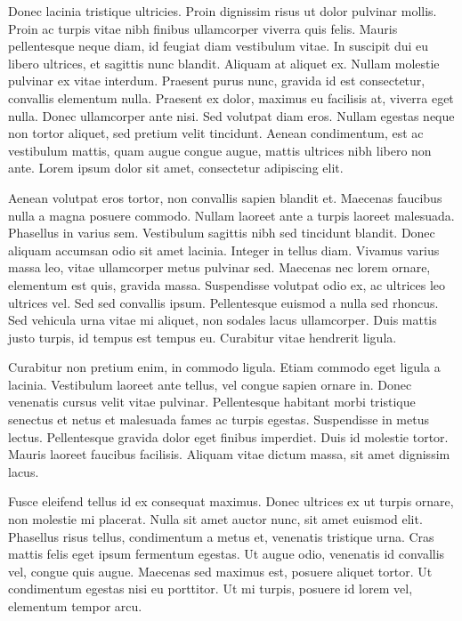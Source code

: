 Donec lacinia tristique ultricies. Proin dignissim risus ut dolor pulvinar mollis. Proin ac turpis vitae nibh finibus ullamcorper viverra quis felis. Mauris pellentesque neque diam, id feugiat diam vestibulum vitae. In suscipit dui eu libero ultrices, et sagittis nunc blandit. Aliquam at aliquet ex. Nullam molestie pulvinar ex vitae interdum. Praesent purus nunc, gravida id est consectetur, convallis elementum nulla. Praesent ex dolor, maximus eu facilisis at, viverra eget nulla. Donec ullamcorper ante nisi. Sed volutpat diam eros. Nullam egestas neque non tortor aliquet, sed pretium velit tincidunt. Aenean condimentum, est ac vestibulum mattis, quam augue congue augue, mattis ultrices nibh libero non ante. Lorem ipsum dolor sit amet, consectetur adipiscing elit.

Aenean volutpat eros tortor, non convallis sapien blandit et. Maecenas faucibus nulla a magna posuere commodo. Nullam laoreet ante a turpis laoreet malesuada. Phasellus in varius sem. Vestibulum sagittis nibh sed tincidunt blandit. Donec aliquam accumsan odio sit amet lacinia. Integer in tellus diam. Vivamus varius massa leo, vitae ullamcorper metus pulvinar sed. Maecenas nec lorem ornare, elementum est quis, gravida massa. Suspendisse volutpat odio ex, ac ultrices leo ultrices vel. Sed sed convallis ipsum. Pellentesque euismod a nulla sed rhoncus. Sed vehicula urna vitae mi aliquet, non sodales lacus ullamcorper. Duis mattis justo turpis, id tempus est tempus eu. Curabitur vitae hendrerit ligula.

Curabitur non pretium enim, in commodo ligula. Etiam commodo eget ligula a lacinia. Vestibulum laoreet ante tellus, vel congue sapien ornare in. Donec venenatis cursus velit vitae pulvinar. Pellentesque habitant morbi tristique senectus et netus et malesuada fames ac turpis egestas. Suspendisse in metus lectus. Pellentesque gravida dolor eget finibus imperdiet. Duis id molestie tortor. Mauris laoreet faucibus facilisis. Aliquam vitae dictum massa, sit amet dignissim lacus.

Fusce eleifend tellus id ex consequat maximus. Donec ultrices ex ut turpis ornare, non molestie mi placerat. Nulla sit amet auctor nunc, sit amet euismod elit. Phasellus risus tellus, condimentum a metus et, venenatis tristique urna. Cras mattis felis eget ipsum fermentum egestas. Ut augue odio, venenatis id convallis vel, congue quis augue. Maecenas sed maximus est, posuere aliquet tortor. Ut condimentum egestas nisi eu porttitor. Ut mi turpis, posuere id lorem vel, elementum tempor arcu.

